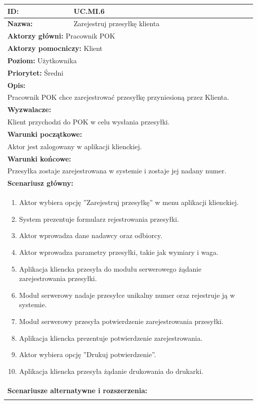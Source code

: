 \begin{center}
\begin{longtable}[h]{|p{1.6cm}|p{13.5cm}|}
\hline
\textbf{ID:} & UC.MI.6 \\ \hline
\textbf{Nazwa:} & Zarejestruj przesyłkę klienta \\ \hline
\multicolumn{2}{|p{15.1cm}|}{\textbf{Aktorzy główni:} Pracownik POK} \\
\multicolumn{2}{|p{15.1cm}|}{\textbf{Aktorzy pomocniczy:} Klient} \\
\multicolumn{2}{|p{15.1cm}|}{\textbf{Poziom:} Użytkownika} \\
\multicolumn{2}{|p{15.1cm}|}{\textbf{Priorytet:} Średni} \\
\hline
\multicolumn{2}{|p{15.1cm}|}{\textbf{Opis:}} \\
\multicolumn{2}{|p{15.1cm}|}{
Pracownik POK chce zarejestrować przesyłkę przyniesioną przez Klienta.
} \\ \hline
\multicolumn{2}{|p{15.1cm}|}{\textbf{Wyzwalacze:}} \\
\multicolumn{2}{|p{15.1cm}|}{
Klient przychodzi do POK w celu wysłania przesyłki.
} \\ \hline
\multicolumn{2}{|p{15.1cm}|}{\textbf{Warunki początkowe:}} \\
\multicolumn{2}{|p{15.1cm}|}{
Aktor jest zalogowany w aplikacji klienckiej.
} \\ \hline
\multicolumn{2}{|p{15.1cm}|}{\textbf{Warunki końcowe:}} \\
\multicolumn{2}{|p{15.1cm}|}{
Przesyłka zostaje zarejestrowana w systemie i zostaje jej nadany numer.
} \\ \hline
\multicolumn{2}{|p{15.1cm}|}{\textbf{Scenariusz główny:}} \\
\multicolumn{2}{|p{15.1cm}|}{
\begin{enumerate}
\item Aktor wybiera opcję ''Zarejestruj przesyłkę'' w menu aplikacji klienckiej.
\item System prezentuje formularz rejestrowania przesyłki.
\item Aktor wprowadza dane nadawcy oraz odbiorcy.
\item Aktor wprowadza parametry przesyłki, takie jak wymiary i waga.
\item Aplikacja kliencka przesyła do modułu serwerowego żądanie zarejestrowania przesyłki.
\item Moduł serwerowy nadaje przesyłce unikalny numer oraz rejestruje ją w systemie.
\item Moduł serwerowy przesyła potwierdzenie zarejestrowania przesyłki.
\item Aplikacja kliencka prezentuje potwierdzenie zarejestrowania.
\item Aktor wybiera opcję ''Drukuj potwierdzenie''.
\item Aplikacja kliencka przesyła żądanie drukowania do drukarki.
\end{enumerate}
} \\ \hline
\multicolumn{2}{|p{15.1cm}|}{\textbf{Scenariusze alternatywne i rozszerzenia:}} \\
\multicolumn{2}{|p{15.1cm}|}{

}
\end{longtable}
\end{center}
